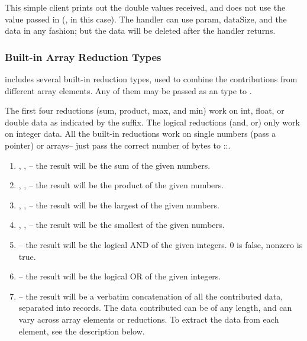 This simple client prints out the double values received, and does not use the  value passed in (, in this case).  The handler can use param, dataSize, and the data in any fashion; but the data will be deleted after the handler returns.


\subsubsection{Built-in Array Reduction Types}
\charmpp includes several built-in reduction types, used to combine the contributions from different array elements.  Any of them may be passed as an  type to .

The first four reductions (sum, product, max, and min) work on int, float, or double data as indicated by the suffix.  The logical reductions (and, or) only work on integer data.  All the built-in reductions work on single numbers (pass a pointer) or arrays-- just pass the correct number of bytes to ::.

\begin{enumerate}
\item {}, , -- the result will be the sum of the given numbers.

\item {}, , -- the result will be the product of the given numbers.

\item {}, , -- the result will be the largest of the given numbers.

\item {}, , -- the result will be the smallest of the given numbers.

\item {}-- the result will be the logical AND of the given integers.  0 is false, nonzero is true.

\item {}-- the result will be the logical OR of the given integers.

\item {}-- the result will be a verbatim concatenation of all the contributed data, separated into  records.  The data contributed can be of any length, and can vary across array elements or reductions.  To extract the data from each element, see the description below.

\end{enumerate}


